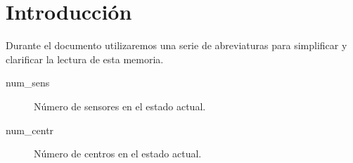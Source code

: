 \section{Introducción}

Durante el documento utilizaremos una serie de abreviaturas para simplificar
y clarificar la lectura de esta memoria.

\begin{description}
  \item[num_sens] Número de sensores en el estado actual.
  \item[num_centr] Número de centros en el estado actual.
\end{description}
